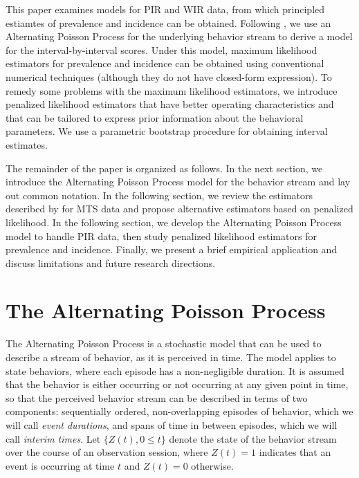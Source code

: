 \documentclass[man, noextraspace, floatsintext]{apa6}\usepackage[]{graphicx}\usepackage[]{color}
\begin{document}
This paper examines models for PIR and WIR data, from which principled estiamtes of prevalence and incidence can be obtained. Following \citet{Brown1977estimation}, we use an Alternating Poisson Process for the underlying behavior stream to derive a model for the interval-by-interval scores. Under this model, maximum likelihood estimators for prevalence and incidence can be obtained using conventional numerical techniques (although they do not have closed-form expression). To remedy some problems with the maximum likelihood estimators, we introduce penalized likelihood estimators that have better operating characteristics and that can be tailored to express prior information about the behavioral parameters. We use a parametric bootstrap procedure for obtaining interval estimates.


The remainder of the paper is organized as follows. In the next section, we introduce the Alternating Poisson Process model for the behavior stream and lay out common notation. In the following section, we review the estimators described by \citet{Brown1977estimation} for MTS data and propose alternative estimators based on penalized likelihood. In the following section, we develop the Alternating Poisson Process model to handle PIR data, then study penalized likelihood estimators for prevalence and incidence. Finally, we present a brief empirical application and discuss limitations and future research directions.

\section{The Alternating Poisson Process}
\label{sec:APP}

The Alternating Poisson Process is a stochastic model that can be used to describe a stream of behavior, as it is perceived in time. The model applies to state behaviors, where each episode has a non-negligible duration. It is assumed that the behavior is either occurring or not occurring at any given point in time, so that the perceived behavior stream can be described in terms of two components: sequentially ordered, non-overlapping episodes of behavior, which we will call \textit{event durations}, and spans of time in between episodes, which we will call \textit{interim times}. Let $\{Z(t), 0 \leq t\}$ denote the state of the behavior stream over the course of an observation session, where $Z(t) = 1$ indicates that an event is occurring at time $t$ and $Z(t) = 0$ otherwise.
\end{document}
